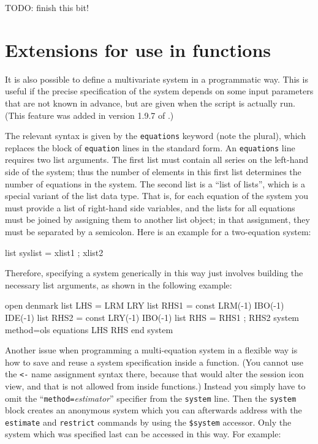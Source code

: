 TODO: finish this bit!

\section{Extensions for use in functions}
\label{sec:system-functions}

It is also possible to define a multivariate system in a programmatic
way. This is useful if the precise specification of the system depends
on some input parameters that are not known in advance, but are given
when the script is actually run. (This feature was added in version
1.9.7 of .)

The relevant syntax is given by the \texttt{equations} keyword (note
the plural), which replaces the block of \texttt{equation} lines in
the standard form. An \texttt{equations} line requires two list
arguments. The first list must contain all series on the left-hand
side of the system; thus the number of elements in this first list
determines the number of equations in the system. The second list is a
``list of lists'', which is a special variant of the list data type.
That is, for each equation of the system you must provide a list of
right-hand side variables, and the lists for all equations must be
joined by assigning them to another list object; in that assignment,
they must be separated by a semicolon.  Here is an example for a
two-equation system:

\begin{code}
list syslist = xlist1 ; xlist2
\end{code}

Therefore, specifying a system generically in this way just involves 
building the necessary list arguments, as shown in the following
example:

\begin{code}
open denmark
list LHS = LRM LRY
list RHS1 = const LRM(-1) IBO(-1) IDE(-1)
list RHS2 = const LRY(-1) IBO(-1)
list RHS = RHS1 ; RHS2
system method=ols
     equations LHS RHS
end system
\end{code}

Another issue when programming a multi-equation system in a flexible
way is how to save and reuse a system specification inside a function.
(You cannot use the \verb|<-| name assignment syntax there, because
that would alter the session icon view, and that is not allowed from
inside functions.) Instead you simply have to omit the
``\texttt{method=}\textsl{estimator}'' specifier from the
\texttt{system} line. Then the \texttt{system} block creates an
anonymous system which you can afterwards address with the
\texttt{estimate} and \texttt{restrict} commands by using the
\verb|$system| accessor. Only the system which was specified last can
be accessed in this way. For example:

